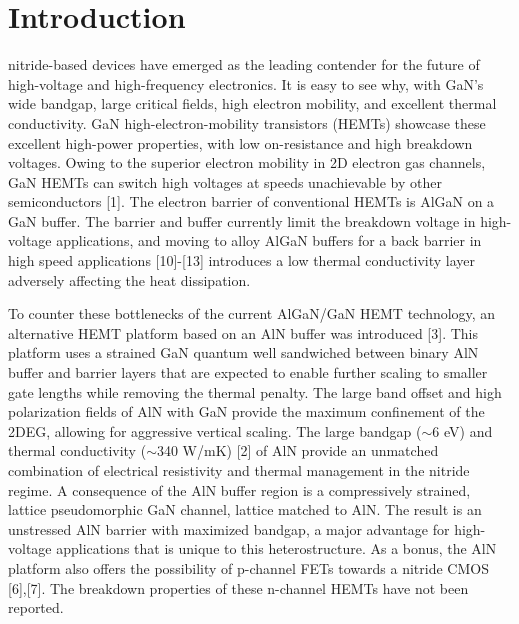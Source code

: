 \documentclass[journal]{IEEEtran}
\begin{document}
%
\IEEEpeerreviewmaketitle
\section{Introduction}
 nitride-based devices have emerged as the leading contender for the future of high-voltage and high-frequency electronics. It is easy to see why, with GaN's wide bandgap, large critical fields, high electron mobility, and excellent thermal conductivity. GaN high-electron-mobility transistors (HEMTs) showcase these excellent high-power properties, with low on-resistance and high breakdown voltages. Owing to the superior electron mobility in 2D electron gas channels, GaN HEMTs can switch high voltages at speeds unachievable by other semiconductors [1]. The electron barrier of conventional HEMTs is AlGaN on a GaN buffer. The barrier and buffer currently limit the breakdown voltage in high-voltage applications, and moving to alloy AlGaN buffers for a back barrier in high speed applications [10]-[13] introduces a low thermal conductivity layer adversely affecting the heat dissipation. 

To counter these bottlenecks of the current AlGaN/GaN HEMT technology, an alternative HEMT platform based on an AlN buffer was introduced [3]. This platform uses a strained GaN quantum well sandwiched between binary AlN buffer and barrier layers that are expected to enable further scaling to smaller gate lengths while removing the thermal penalty. The large band offset and high polarization fields of AlN with GaN provide the maximum confinement of the 2DEG, allowing for aggressive vertical scaling. The large bandgap ($\sim$6 eV) and thermal conductivity ($\sim$340 W/mK) [2] of AlN provide an unmatched combination of electrical resistivity and thermal management in the nitride regime. A consequence of the AlN buffer region is a compressively strained, lattice pseudomorphic GaN channel, lattice matched to AlN. The result is an unstressed AlN barrier with maximized bandgap, a major advantage for high-voltage applications that is unique to this heterostructure. As a bonus, the AlN platform also offers the possibility of p-channel FETs towards a nitride CMOS [6],[7].  The breakdown properties of these n-channel HEMTs have not been reported.
\end{document}
